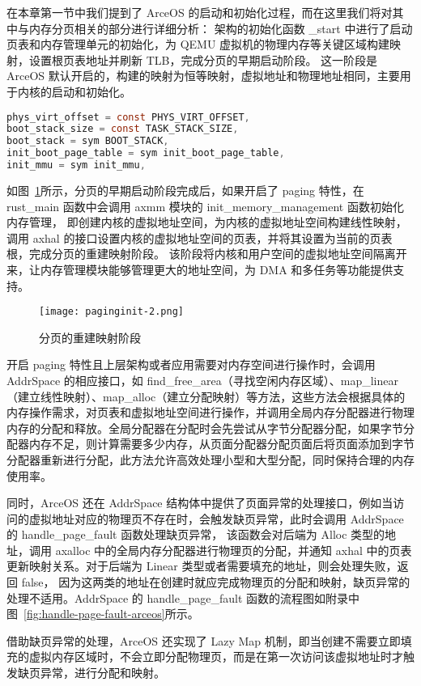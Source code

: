 在本章第一节中我们提到了 ArceOS 的启动和初始化过程，而在这里我们将对其中与内存分页相关的部分进行详细分析：
架构的初始化函数 \_start 中进行了启动页表和内存管理单元的初始化，为 QEMU 虚拟机的物理内存等关键区域构建映射，设置根页表地址并刷新 TLB，完成分页的早期启动阶段。
这一阶段是 ArceOS 默认开启的，构建的映射为恒等映射，虚拟地址和物理地址相同，主要用于内核的启动和初始化。
\begin{lstlisting}[language=c, caption= ArceOS 中 \_start 启动函数内存初始化相关代码]
phys_virt_offset = const PHYS_VIRT_OFFSET,
boot_stack_size = const TASK_STACK_SIZE,
boot_stack = sym BOOT_STACK,
init_boot_page_table = sym init_boot_page_table,
init_mmu = sym init_mmu,
\end{lstlisting}

如图~\ref{fig:init}所示，分页的早期启动阶段完成后，如果开启了 paging 特性，在 rust\_main 函数中会调用 axmm 模块的 init\_memory\_management 函数初始化内存管理，
即创建内核的虚拟地址空间，为内核的虚拟地址空间构建线性映射，调用 axhal 的接口设置内核的虚拟地址空间的页表，并将其设置为当前的页表根，完成分页的重建映射阶段。
该阶段将内核和用户空间的虚拟地址空间隔离开来，让内存管理模块能够管理更大的地址空间，为 DMA 和多任务等功能提供支持。

\begin{figure}[H]
    \centering
    \texttt{[image: paginginit-2.png]}
    \caption{分页的重建映射阶段}
    \label{fig:init}
\end{figure}

开启 paging 特性且上层架构或者应用需要对内存空间进行操作时，会调用 AddrSpace 的相应接口，如 find\_free\_area（寻找空闲内存区域）、map\_linear（建立线性映射）、map\_alloc（建立分配映射）等方法，这些方法会根据具体的内存操作需求，对页表和虚拟地址空间进行操作，并调用全局内存分配器进行物理内存的分配和释放。全局分配器在分配时会先尝试从字节分配器分配，如果字节分配器内存不足，则计算需要多少内存，从页面分配器分配页面后将页面添加到字节分配器重新进行分配，此方法允许高效处理小型和大型分配，同时保持合理的内存使用率。

同时，ArceOS 还在 AddrSpace 结构体中提供了页面异常的处理接口，例如当访问的虚拟地址对应的物理页不存在时，会触发缺页异常，此时会调用 AddrSpace 的 handle\_page\_fault 函数处理缺页异常，
该函数会对后端为 Alloc 类型的地址，调用 axalloc 中的全局内存分配器进行物理页的分配，并通知 axhal 中的页表更新映射关系。对于后端为 Linear 类型或者需要填充的地址，则会处理失败，返回 false，
因为这两类的地址在创建时就应完成物理页的分配和映射，缺页异常的处理不适用。AddrSpace 的 handle\_page\_fault 函数的流程图如附录中图~\ref{fig:handle-page-fault-arceos}所示。



借助缺页异常的处理，ArceOS 还实现了 Lazy Map 机制，即当创建不需要立即填充的虚拟内存区域时，不会立即分配物理页，而是在第一次访问该虚拟地址时才触发缺页异常，进行分配和映射。